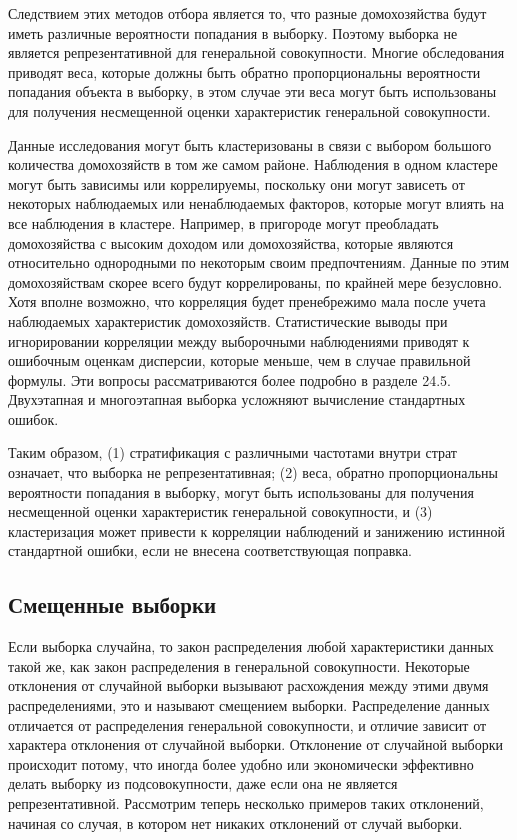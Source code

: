 Следствием этих методов отбора является то, что разные домохозяйства будут иметь различные вероятности попадания в выборку. Поэтому выборка не является репрезентативной для генеральной совокупности. Многие обследования приводят веса, которые должны быть обратно пропорциональны вероятности попадания объекта в выборку, в этом случае эти веса могут быть использованы для получения несмещенной оценки характеристик генеральной совокупности.
	
	
Данные исследования могут быть кластеризованы в связи с выбором большого количества домохозяйств в том же самом районе. Наблюдения в одном кластере могут быть зависимы или коррелируемы, поскольку они могут зависеть от некоторых наблюдаемых или ненаблюдаемых факторов, которые могут влиять на все наблюдения в кластере. 
Например, в пригороде могут преобладать домохозяйства с высоким доходом или домохозяйства, которые являются относительно однородными по некоторым своим предпочтениям. Данные по этим  домохозяйствам скорее всего будут коррелированы, по крайней мере безусловно. Хотя вполне возможно, что корреляция будет пренебрежимо мала после учета наблюдаемых характеристик домохозяйств. 
Статистические выводы при  игнорировании корреляции между выборочными наблюдениями приводят к ошибочным оценкам дисперсии, которые меньше, чем в случае правильной формулы. Эти вопросы рассматриваются более подробно в разделе 24.5. Двухэтапная и многоэтапная выборка усложняют вычисление стандартных ошибок.
	
	
Таким образом, (1) стратификация с различными частотами внутри страт означает, что выборка не репрезентативная; (2) веса, обратно пропорциональны вероятности попадания в выборку, могут быть использованы для получения несмещенной оценки характеристик генеральной совокупности, и (3) кластеризация может привести к корреляции наблюдений и занижению истинной стандартной ошибки, если не внесена соответствующая поправка.
	
	
\subsection{Смещенные выборки}

Если выборка случайна, то закон распределения любой характеристики данных такой же, как закон  распределения в генеральной совокупности. Некоторые отклонения от случайной выборки вызывают расхождения между этими двумя распределениями, это и называют смещением выборки. Распределение данных отличается от распределения генеральной совокупности, и отличие  зависит от характера отклонения от случайной выборки. Отклонение от случайной выборки происходит потому, что иногда более удобно или экономически эффективно делать выборку из подсовокупности, даже если она не является репрезентативной. Рассмотрим теперь несколько примеров таких отклонений, начиная со случая, в котором нет никаких отклонений от случай выборки.

